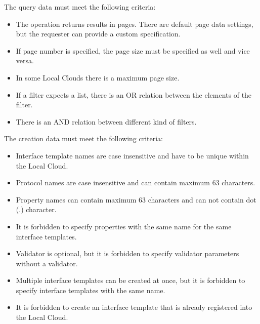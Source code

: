 \documentclass[a4paper]{arrowhead}
\begin{document}


The query data must meet the following criteria:

\begin{itemize}
    \item The operation returns results in pages. There are default page data settings, but the requester can provide a custom specification.
    \item If page number is specified, the page size must be specified as well and vice versa.
    \item In some Local Clouds there is a maximum page size.
    \item If a filter expects a list, there is an OR relation between the elements of the filter.
    \item There is an AND relation between different kind of filters.
\end{itemize} 


The creation data must meet the following criteria:

\begin{itemize}
    \item Interface template names are case insensitive and have to be unique within the Local Cloud.
    \item Protocol names are case insensitive and can contain maximum 63 characters.
    \item Property names can contain maximum 63 characters and can not contain dot (.) character.
    \item It is forbidden to specify properties with the same name for the same interface templates.
    \item Validator is optional, but it is forbidden to specify validator parameters without a validator.
    \item Multiple interface templates can be created at once, but it is forbidden to specify interface templates with the same name.
    \item It is forbidden to create an interface template that is already registered into the Local Cloud.
\end{itemize}
\end{document}
